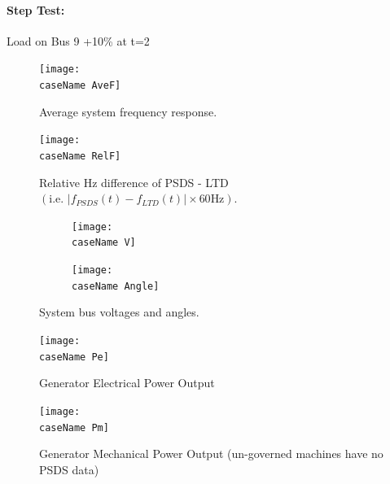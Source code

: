 \documentclass[12pt]{article}
\begin{document}
\pagebreak
\newcommand{\caseName}{SixMachineStep2}
\paragraph{Step Test:} Load on Bus 9 +10\% at t=2
	\begin{figure}[h!]
			\centering
			\texttt{[image: \\caseName AveF]}\vspace{-.5em}
			\caption{Average system frequency response.}
			\label{\caseName F}		 
	\end{figure}%


	\begin{figure}[h!]
			\centering
			\texttt{[image: \\caseName RelF]}\vspace{-.5em}
			\caption{Relative Hz difference of PSDS - LTD $\left( \text{i.e. }  \left|f_{PSDS}(t)- f_{LTD}(t)\right| \times 60 \text{Hz} \right)$.}
			\label{\caseName RelF}		 
	\end{figure}%

\begin{figure}[h!]
	\centering
	\begin{subfigure}{.48\linewidth}
		\centering
		\texttt{[image: \\caseName V]}\vspace{-.5em}
		\label{fig:sfig1}
	\end{subfigure}\hspace{1em}%
	\begin{subfigure}{.48\linewidth}
		\centering
		\texttt{[image: \\caseName Angle]}\vspace{-.5em}
		\label{fig:sfig2}
	\end{subfigure}
	\caption{System bus voltages and angles.}
	\label{fig:\caseName V}		 
\end{figure}%

%
\pagebreak
	\begin{figure}[h!]
			\centering
			\texttt{[image: \\caseName Pe]}\vspace{-.5em}
			\caption{Generator Electrical Power Output}
			\label{\caseName Pe}		 
	\end{figure}%
	\begin{figure}[h!]
			\centering
			\texttt{[image: \\caseName Pm]}\vspace{-.5em}
			\caption{Generator Mechanical Power Output (un-governed machines have no PSDS data)}
			\label{\caseName Pm}		 
	\end{figure}%
\end{document}
